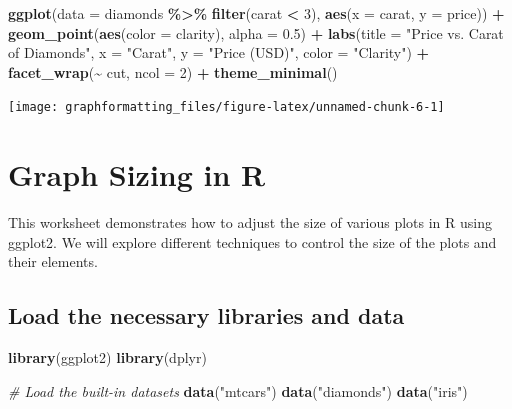 \documentclass[
]{book}
\newenvironment{Shaded}{\begin{snugshade}}{\end{snugshade}}
\newcommand{\AttributeTok}[1]{\textcolor[rgb]{0.13,0.29,0.53}{#1}}
\newcommand{\CommentTok}[1]{\textcolor[rgb]{0.56,0.35,0.01}{\textit{#1}}}
\newcommand{\DecValTok}[1]{\textcolor[rgb]{0.00,0.00,0.81}{#1}}
\newcommand{\FloatTok}[1]{\textcolor[rgb]{0.00,0.00,0.81}{#1}}
\newcommand{\FunctionTok}[1]{\textcolor[rgb]{0.13,0.29,0.53}{\textbf{#1}}}
\newcommand{\NormalTok}[1]{#1}
\newcommand{\SpecialCharTok}[1]{\textcolor[rgb]{0.81,0.36,0.00}{\textbf{#1}}}
\newcommand{\StringTok}[1]{\textcolor[rgb]{0.31,0.60,0.02}{#1}}
\begin{document}
\begin{Shaded}
\begin{Highlighting}[]
\FunctionTok{ggplot}\NormalTok{(}\AttributeTok{data =}\NormalTok{ diamonds }\SpecialCharTok{\%\textgreater{}\%} \FunctionTok{filter}\NormalTok{(carat }\SpecialCharTok{\textless{}} \DecValTok{3}\NormalTok{), }\FunctionTok{aes}\NormalTok{(}\AttributeTok{x =}\NormalTok{ carat, }\AttributeTok{y =}\NormalTok{ price)) }\SpecialCharTok{+}
  \FunctionTok{geom\_point}\NormalTok{(}\FunctionTok{aes}\NormalTok{(}\AttributeTok{color =}\NormalTok{ clarity), }\AttributeTok{alpha =} \FloatTok{0.5}\NormalTok{) }\SpecialCharTok{+}
  \FunctionTok{labs}\NormalTok{(}\AttributeTok{title =} \StringTok{"Price vs. Carat of Diamonds"}\NormalTok{,}
       \AttributeTok{x =} \StringTok{"Carat"}\NormalTok{,}
       \AttributeTok{y =} \StringTok{"Price (USD)"}\NormalTok{,}
       \AttributeTok{color =} \StringTok{"Clarity"}\NormalTok{) }\SpecialCharTok{+}
  \FunctionTok{facet\_wrap}\NormalTok{(}\SpecialCharTok{\textasciitilde{}}\NormalTok{ cut, }\AttributeTok{ncol =} \DecValTok{2}\NormalTok{) }\SpecialCharTok{+}
  \FunctionTok{theme\_minimal}\NormalTok{()}
\end{Highlighting}
\end{Shaded}

\texttt{[image: graphformatting\_files/figure-latex/unnamed-chunk-6-1]}

\hypertarget{graph-sizing-in-r}{%
\section{Graph Sizing in R}\label{graph-sizing-in-r}}

This worksheet demonstrates how to adjust the size of various plots in R using ggplot2. We will explore different techniques to control the size of the plots and their elements.

\hypertarget{load-the-necessary-libraries-and-data}{%
\subsection{Load the necessary libraries and data}\label{load-the-necessary-libraries-and-data}}

\begin{Shaded}
\begin{Highlighting}[]
\FunctionTok{library}\NormalTok{(ggplot2)}
\FunctionTok{library}\NormalTok{(dplyr)}

\CommentTok{\# Load the built{-}in datasets}
\FunctionTok{data}\NormalTok{(}\StringTok{"mtcars"}\NormalTok{)}
\FunctionTok{data}\NormalTok{(}\StringTok{"diamonds"}\NormalTok{)}
\FunctionTok{data}\NormalTok{(}\StringTok{"iris"}\NormalTok{)}
\end{Highlighting}
\end{Shaded}
\end{document}
